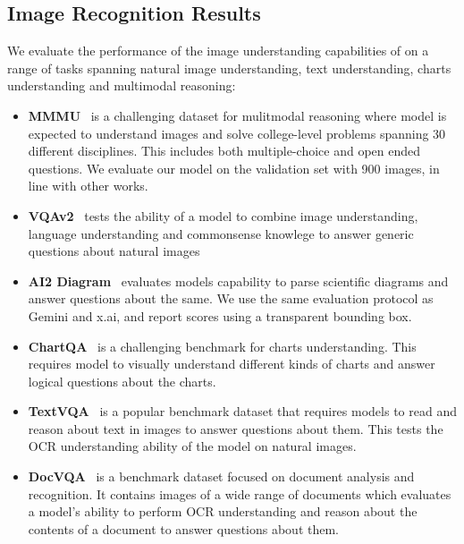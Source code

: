 \subsection{Image Recognition Results}
\label{section:results_image_recognition}

We evaluate the performance of the image understanding capabilities of \llamathree on a range of tasks spanning natural image understanding, text understanding, charts understanding and multimodal reasoning:
\begin{itemize}
\item \textbf{MMMU}~\citep{yue2023mmmu} is a challenging dataset for mulitmodal reasoning where model is expected to understand
images and solve college-level problems spanning 30 different disciplines. This includes both multiple-choice and open ended
questions. We evaluate our model on the validation set with 900 images, in line with other works.

\item \textbf{VQAv2}~\citep{vqav2} tests the ability of a model to combine image understanding, language understanding and
commonsense knowlege to answer generic questions about natural images

\item \textbf{AI2 Diagram}~\citep{Kembhavi2016ADI} evaluates models capability to parse scientific diagrams
and answer questions about the same. We use the same evaluation protocol as Gemini and x.ai, and report scores using a transparent bounding box.

\item \textbf{ChartQA}~\citep{masry-etal-2022-chartqa} is a challenging benchmark for charts understanding. This requires
model to visually understand different kinds of charts and answer logical questions about the charts.

\item \textbf{TextVQA}~\citep{singh2019towards} is a popular benchmark dataset that requires
models to read and reason about text in images to answer questions about them. This tests the
OCR understanding ability of the model on natural images.

\item \textbf{DocVQA}~\citep{Mathew2020DocVQAAD} is a benchmark dataset focused on document analysis and recognition.
It contains images of a wide range of documents which evaluates a model's ability to perform OCR understanding
and reason about the contents of a document to answer questions about them.
\end{itemize}

